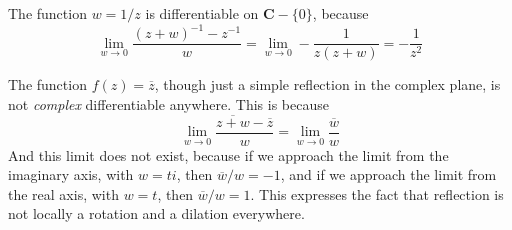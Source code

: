 \begin{example}
    The function $w = 1/z$ is differentiable on $\mathbf{C} - \{ 0 \}$, because
    \[ \lim_{w \to 0} \frac{(z + w)^{-1} - z^{-1}}{w} = \lim_{w \to 0} -\frac{1}{z(z+w)} = -\frac{1}{z^2} \]
\end{example}

\begin{example}
    The function $f(z) = \overline{z}$, though just a simple reflection in the complex plane, is not {\it complex} differentiable anywhere. This is because
    \[ \lim_{w \to 0} \frac{\overline{z + w} - \overline{z}}{w} = \lim_{w \to 0} \frac{\overline{w}}{w} \]
    And this limit does not exist, because if we approach the limit from the imaginary axis, with $w = ti$, then $\overline{w}/w = -1$, and if we approach the limit from the real axis, with $w = t$, then $\overline{w}/w = 1$. This expresses the fact that reflection is not locally a rotation and a dilation everywhere.
\end{example}

